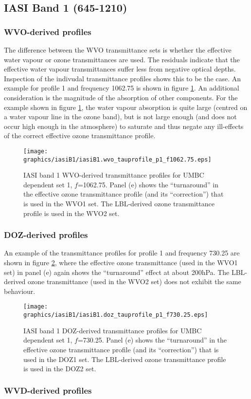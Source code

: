 \subsection{IASI Band 1 (645-1210\invcm)}

\subsubsection{WVO-derived profiles}
The difference between the WVO transmittance sets is whether the effective water vapour or ozone transmittances are used. The residuals indicate that the effective water vapour transmittances suffer less from negative optical depths. Inspection of the indivudal transmittance profiles shows this to be the case. An example for profile 1 and frequency 1062.75\invcm{} is shown in figure \ref{fig:iasiB1.wvo_tauprofile_p1_f1062.75}. An additional consideration is the magnitude of the absorption of other components. For the example shown in figure \ref{fig:iasiB1.wvo_tauprofile_p1_f1062.75}, the water vapour absorption is quite large (centred on a water vapour line in the ozone band), but is not large enough (and does not occur high enough in the atmosphere) to saturate and thus negate any ill-effects of the correct effective ozone transmittance profile.
\begin{figure}[htp]
  \centering
  \texttt{[image: graphics/iasiB1/iasiB1.wvo\_tauprofile\_p1\_f1062.75.eps]}
  \caption{IASI band 1 WVO-derived transmittance profiles for UMBC dependent set 1, $f$=1062.75\invcm{}. Panel (e) shows the ``turnaround'' in the effective ozone transmittance profile (and its ``correction'') that is used in the WVO1 set. The LBL-derived ozone transmittance profile is used in the WVO2 set.}
  \label{fig:iasiB1.wvo_tauprofile_p1_f1062.75}
\end{figure}


\subsubsection{DOZ-derived profiles}
An example of the transmittance profiles for profile 1 and frequency 730.25\invcm{} are shown in figure \ref{fig:iasiB1.doz_tauprofile_p1_f730.25}, where the effective ozone transmittance (used in the WVO1 set) in panel (e) again shows the ``turnaround'' effect at about 200hPa. The LBL-derived ozone transmittance (used in the WVO2 set) does not exhibit the same behaviour.
\begin{figure}[htp]
  \centering
  \texttt{[image: graphics/iasiB1/iasiB1.doz\_tauprofile\_p1\_f730.25.eps]}
  \caption{IASI band 1 DOZ-derived transmittance profiles for UMBC dependent set 1, $f$=730.25\invcm{}. Panel (e) shows the ``turnaround'' in the effective ozone transmittance profile (and its ``correction'') that is used in the DOZ1 set. The LBL-derived ozone transmittance profile is used in the DOZ2 set.}
  \label{fig:iasiB1.doz_tauprofile_p1_f730.25}
\end{figure}


\subsubsection{WVD-derived profiles}

